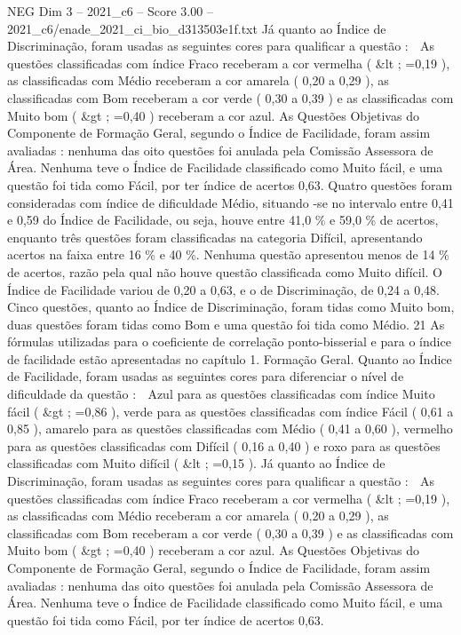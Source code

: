 \begin{textsample}{NEG Dim 3 – 2021\_c6 – Score 3.00 – 2021\_c6/enade\_2021\_ci\_bio\_d313503e1f.txt}
Já quanto ao Índice de Discriminação, foram usadas as seguintes cores para qualificar a questão :  As questões classificadas com índice Fraco receberam a cor vermelha ( \&lt ; =0,19 ), as classificadas com Médio receberam a cor amarela ( 0,20 a 0,29 ), as classificadas com Bom receberam a cor verde ( 0,30 a 0,39 ) e as classificadas com Muito bom ( \&gt ; =0,40 ) receberam a cor azul.
As Questões Objetivas do Componente de Formação Geral, segundo o Índice de Facilidade, foram assim avaliadas : nenhuma das oito questões foi anulada pela Comissão Assessora de Área.
Nenhuma teve o Índice de Facilidade classificado como Muito fácil, e uma questão foi tida como Fácil, por ter índice de acertos 0,63.
Quatro questões foram consideradas com índice de dificuldade Médio, situando -se no intervalo entre 0,41 e 0,59 do Índice de Facilidade, ou seja, houve entre 41,0 \% e 59,0 \% de acertos, enquanto três questões foram classificadas na categoria Difícil, apresentando acertos na faixa entre 16 \% e 40 \%.
Nenhuma questão apresentou menos de 14 \% de acertos, razão pela qual não houve questão classificada como Muito difícil.
O Índice de Facilidade variou de 0,20 a 0,63, e o de Discriminação, de 0,24 a 0,48.
Cinco questões, quanto ao Índice de Discriminação, foram tidas como Muito bom, duas questões foram tidas como Bom e uma questão foi tida como Médio. 21 As fórmulas utilizadas para o coeficiente de correlação ponto-bisserial e para o índice de facilidade estão apresentadas no capítulo 1.
Formação Geral.
Quanto ao Índice de Facilidade, foram usadas as seguintes cores para diferenciar o nível de dificuldade da questão :  Azul para as questões classificadas com índice Muito fácil ( \&gt ; =0,86 ), verde para as questões classificadas com índice Fácil ( 0,61 a 0,85 ), amarelo para as questões classificadas com Médio ( 0,41 a 0,60 ), vermelho para as questões classificadas com Difícil ( 0,16 a 0,40 ) e roxo para as questões classificadas com Muito difícil ( \&lt ; =0,15 ).
Já quanto ao Índice de Discriminação, foram usadas as seguintes cores para qualificar a questão :  As questões classificadas com índice Fraco receberam a cor vermelha ( \&lt ; =0,19 ), as classificadas com Médio receberam a cor amarela ( 0,20 a 0,29 ), as classificadas com Bom receberam a cor verde ( 0,30 a 0,39 ) e as classificadas com Muito bom ( \&gt ; =0,40 ) receberam a cor azul.
As Questões Objetivas do Componente de Formação Geral, segundo o Índice de Facilidade, foram assim avaliadas : nenhuma das oito questões foi anulada pela Comissão Assessora de Área.
Nenhuma teve o Índice de Facilidade classificado como Muito fácil, e uma questão foi tida como Fácil, por ter índice de acertos 0,63.

\end{textsample}
